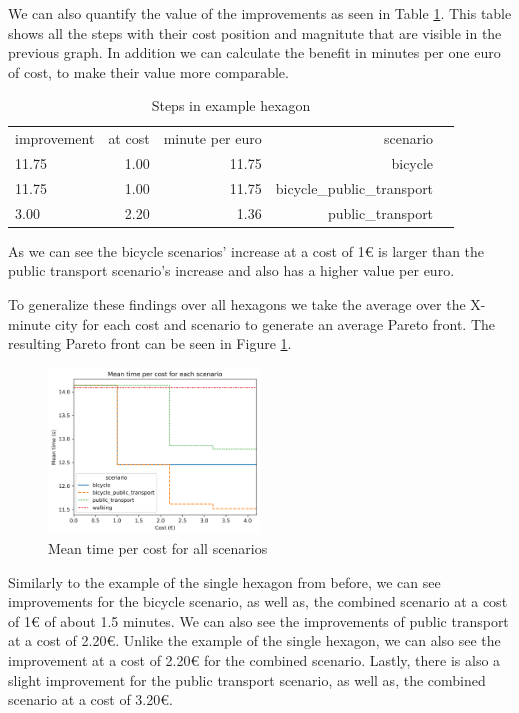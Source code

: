 We can also quantify the value of the improvements as seen in Table \ref{tab:differences_in_example_hexagon}.
This table shows all the steps with their cost position and magnitute that are visible in the previous graph.
In addition we can calculate the benefit in minutes per one euro of cost, to make their value more comparable.
\begin{table}
  \caption{Steps in example hexagon}
  \label{tab:differences_in_example_hexagon}
  \begin{center}
    \begin{tabular}{lrrrl}
    improvement & at cost & minute per euro & scenario \\
    11.75 & 1.00 & 11.75 & bicycle \\
    11.75 & 1.00 & 11.75 & bicycle_public_transport \\
    3.00 & 2.20 & 1.36 & public_transport \\
    \end{tabular}
  \end{center}
\end{table}
As we can see the bicycle scenarios' increase at a cost of 1€ is larger than the public transport scenario's increase and also has a higher value per euro.

To generalize these findings over all hexagons we take the average over the X-minute city for each cost and scenario to generate an average Pareto front.
The resulting Pareto front can be seen in Figure \ref{fig:mean_time_per_cost}.

\begin{figure}
  \begin{center}
     \includegraphics[width=0.5\textwidth]{Figures/results/metric_cost/mean_time_per_cost}
  \end{center}
  \caption{Mean time per cost for all scenarios}
  \label{fig:mean_time_per_cost}
\end{figure}

Similarly to the example of the single hexagon from before, we can see improvements for the bicycle scenario, as well as, the combined scenario at a cost of 1€ of about 1.5 minutes.
We can also see the improvements of public transport at a cost of 2.20€.
Unlike the example of the single hexagon, we can also see the improvement at a cost of 2.20€ for the combined scenario.
Lastly, there is also a slight improvement for the public transport scenario, as well as, the combined scenario at a cost of 3.20€.

